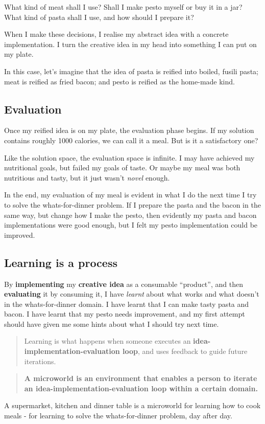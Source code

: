 What kind of meat shall I use? Shall I make pesto myself or buy it in a jar?
What kind of pasta shall I use, and how should I prepare it?

When I make these decisions, I realise my abstract idea
with a concrete implementation. I turn the creative idea in my head
into something I can put on my plate. 

In this case, let's imagine that the idea of pasta is reified into boiled, fusili pasta; meat is reified as fried bacon; and pesto is reified as the home-made kind. 

\subsection{Evaluation}

Once my reified idea is on my plate, the evaluation phase begins. If my
solution contains roughly 1000 calories, we can call it a meal. But is
it a satisfactory one?

Like the solution space, the evaluation space is infinite. I may have
achieved my nutritional goals, but failed my goals of taste. Or maybe my
meal was both nutritious and tasty, but it just wasn't \emph{novel}
enough.

In the end, my evaluation of my meal is evident in what I do the next time I try to solve the whats-for-dinner problem. If I prepare the pasta and the bacon in the same way, but change how I make the pesto, then evidently my pasta and bacon implementations were good enough, but I felt my pesto implementation could be improved. 

\subsection{Learning is a process}

By \textbf{implementing} my \textbf{creative idea} as a consumable ``product'', and then \textbf{evaluating} it by consuming it, I have \textit{learnt} about what works and what doesn't in the whats-for-dinner domain. I have learnt that I can make tasty pasta and bacon. I have learnt that my pesto needs improvement, and my first attempt should have given me some hints about what I should try next time. 

\begin{quote}
  Learning is what happens when someone executes an
  \textbf{idea-implementation-evaluation loop}, and uses feedback to guide future
  iterations.
\end{quote}

\begin{quote}
  \textbf{A microworld is an environment that enables a person to iterate
  an idea-implementation-evaluation loop within a certain domain.}
\end{quote}

A supermarket, kitchen and dinner table is a microworld for learning how to cook meals - for learning to solve the whats-for-dinner problem, day after day.
